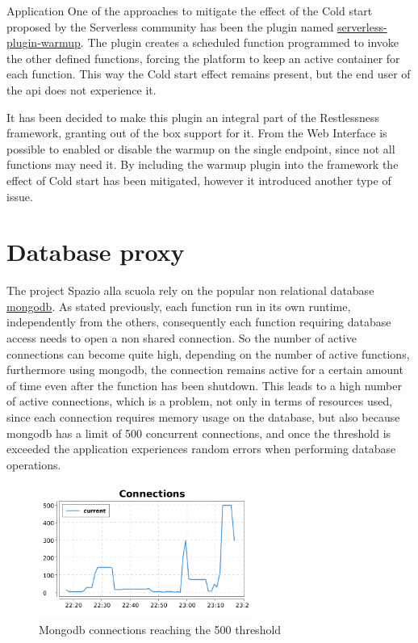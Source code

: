\begin{chapter}{Application}
    One of the approaches to mitigate the effect of the Cold start proposed by the
    Serverless community has been the plugin named
    \href{https://www.npmjs.com/package/serverless-plugin-warmup}{serverless-plugin-warmup}.
    The plugin creates a scheduled function programmed to invoke the other defined functions,
    forcing the platform to keep an active container for each function.
    This way the Cold start effect remains present, but the end user of the api does
    not experience it.

    It has been decided to make this plugin an integral part of the Restlessness framework,
    granting out of the box support for it. From the Web Interface is possible to
    enabled or disable the warmup on the single endpoint, since not all functions may
    need it.
    By including the warmup plugin into the framework the effect of Cold start has
    been mitigated, however it introduced another type of issue.

    \section{Database proxy}
    The project Spazio alla scuola rely on the popular non relational database
    \href{https://www.mongodb.com}{mongodb}. As stated previously, each function
    run in its own runtime, independently from the others, consequently each function
    requiring database access needs to open a non shared connection.
    So the number of active connections can become quite high, depending on the number
    of active functions, furthermore using mongodb, the connection remains active for
    a certain amount of time even after the function has been shutdown.
    This leads to a high number of active connections, which is a problem, not only
    in terms of resources used, since each connection requires memory usage on the
    database, but also because mongodb has a limit of 500 concurrent connections,
    and once the threshold is exceeded the application experiences random errors when
    performing database operations.
    \begin{figure}
        \centering
        \includegraphics[width=7cm]{source/images/mongo-connections.png}
        \caption{Mongodb connections reaching the 500 threshold}
    \end{figure}


\end{chapter}
